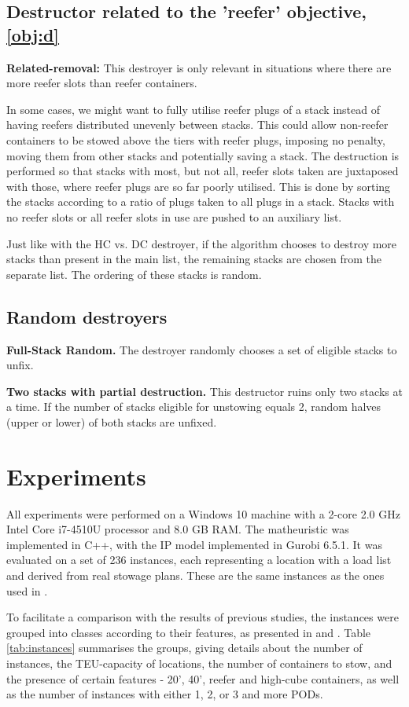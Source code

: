 \documentclass[preprint,12pt,3p]{elsarticle}
\begin{document}
\subsection{Destructor related to the 'reefer' objective, \ref{obj:d}}
\textbf{Related-removal:} This destroyer is only relevant in situations where there are more reefer slots than reefer containers.

In some cases, we might want to fully utilise reefer plugs of a stack instead of having reefers distributed unevenly between stacks. This could allow non-reefer containers to be stowed above the tiers with reefer plugs, imposing no penalty, moving them from other stacks and potentially saving a stack. The destruction is performed so that stacks with most, but not all, reefer slots taken are juxtaposed with those, where reefer plugs are so far poorly utilised. This is done by sorting the stacks according to a ratio of plugs taken to all plugs in a stack. Stacks with no reefer slots or all reefer slots in use are pushed to an auxiliary list.

Just like with the HC vs. DC destroyer, if the algorithm chooses to destroy more stacks than present in the main list, the remaining stacks are chosen from the separate list. The ordering of these stacks is random. 

\subsection{Random destroyers}
\textbf{Full-Stack Random.} The destroyer randomly chooses a set of eligible stacks to unfix.

\textbf{Two stacks with partial destruction.} This destructor ruins only two stacks at a time. If the number of stacks eligible for unstowing equals 2, random halves (upper or lower) of both stacks are unfixed.

\section{Experiments}
\label{sec:Experiments}
All experiments were performed on a Windows 10 machine with a 2-core 2.0 GHz Intel Core i7-4510U processor and 8.0 GB RAM. The matheuristic was implemented in C++, with the IP model implemented in Gurobi 6.5.1. It was evaluated on a set of 236 instances, each representing a location with a load list and derived from real stowage plans. These are the same instances as the ones used in \cite{DJJRA12}.

To facilitate a comparison with the results of previous studies, the instances were grouped into classes according to their features, as presented in \cite{DJJRA12} and \cite{PPAV16}. Table \ref{tab:instances} summarises the groups, giving details about the number of instances, the TEU-capacity of locations, the number of containers to stow, and the presence of certain features - 20', 40', reefer and high-cube containers, as well as the number of instances with either 1, 2, or 3 and more PODs.
\end{document}
